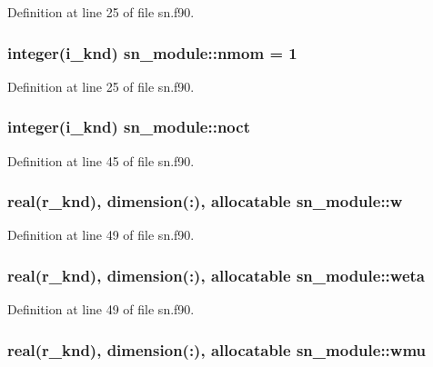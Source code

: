 Definition at line 25 of file sn.\-f90.

\hypertarget{classsn__module_ad3d327af15ae17449d60cbeddafa7b32}{
\subsubsection[{nmom}]{\setlength{\rightskip}{0pt plus 5cm}integer(i\-\_\-knd) sn\-\_\-module\-::nmom = 1}}\label{classsn__module_ad3d327af15ae17449d60cbeddafa7b32}


Definition at line 25 of file sn.\-f90.

\hypertarget{classsn__module_a981cf289719fc9d8b6be965decbf841a}{
\subsubsection[{noct}]{\setlength{\rightskip}{0pt plus 5cm}integer(i\-\_\-knd) sn\-\_\-module\-::noct}}\label{classsn__module_a981cf289719fc9d8b6be965decbf841a}


Definition at line 45 of file sn.\-f90.

\hypertarget{classsn__module_a109cb91fae331094d4e39d49580b30d3}{
\subsubsection[{w}]{\setlength{\rightskip}{0pt plus 5cm}real(r\-\_\-knd), dimension(\-:), allocatable sn\-\_\-module\-::w}}\label{classsn__module_a109cb91fae331094d4e39d49580b30d3}


Definition at line 49 of file sn.\-f90.

\hypertarget{classsn__module_ae34946f144f7ac3c298cc15fb0ba7f1d}{
\subsubsection[{weta}]{\setlength{\rightskip}{0pt plus 5cm}real(r\-\_\-knd), dimension(\-:), allocatable sn\-\_\-module\-::weta}}\label{classsn__module_ae34946f144f7ac3c298cc15fb0ba7f1d}


Definition at line 49 of file sn.\-f90.

\hypertarget{classsn__module_a184aa5bf38e29bc2afe65a69d4d26551}{
\subsubsection[{wmu}]{\setlength{\rightskip}{0pt plus 5cm}real(r\-\_\-knd), dimension(\-:), allocatable sn\-\_\-module\-::wmu}}\label{classsn__module_a184aa5bf38e29bc2afe65a69d4d26551}



